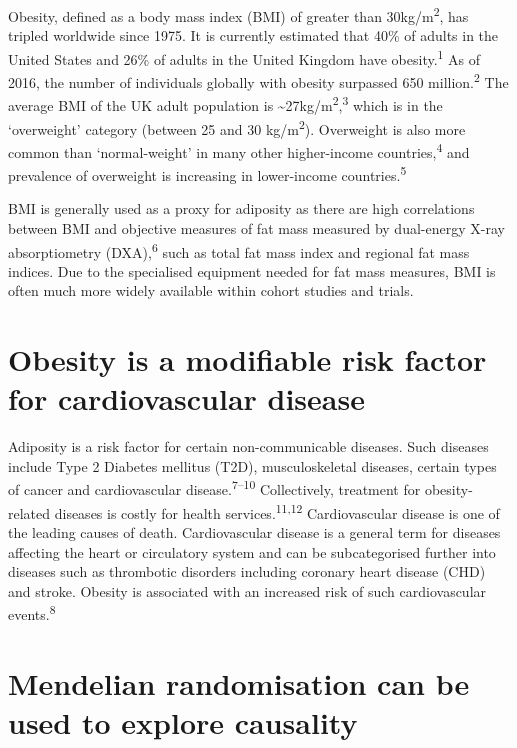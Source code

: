 \documentclass[11pt,twoside]{bristolthesis}
\begin{document}
Obesity, defined as a body mass index (BMI) of greater than 30kg/m\textsuperscript{2}, has tripled worldwide since 1975. It is currently estimated that 40\% of adults in the United States and 26\% of adults in the United Kingdom have obesity.\textsuperscript{1} As of 2016, the number of individuals globally with obesity surpassed 650 million.\textsuperscript{2} The average BMI of the UK adult population is \textasciitilde27kg/m\textsuperscript{2},\textsuperscript{3} which is in the `overweight' category (between 25 and 30 kg/m\textsuperscript{2}). Overweight is also more common than `normal-weight' in many other higher-income countries,\textsuperscript{4} and prevalence of overweight is increasing in lower-income countries.\textsuperscript{5}

BMI is generally used as a proxy for adiposity as there are high correlations between BMI and objective measures of fat mass measured by dual-energy X-ray absorptiometry (DXA),\textsuperscript{6} such as total fat mass index and regional fat mass indices. Due to the specialised equipment needed for fat mass measures, BMI is often much more widely available within cohort studies and trials.

\hypertarget{obesity-is-a-modifiable-risk-factor-for-cardiovascular-disease}{%
\section{Obesity is a modifiable risk factor for cardiovascular disease}\label{obesity-is-a-modifiable-risk-factor-for-cardiovascular-disease}}

Adiposity is a risk factor for certain non-communicable diseases. Such diseases include Type 2 Diabetes mellitus (T2D), musculoskeletal diseases, certain types of cancer and cardiovascular disease.\textsuperscript{7--10} Collectively, treatment for obesity-related diseases is costly for health services.\textsuperscript{11,12} Cardiovascular disease is one of the leading causes of death. Cardiovascular disease is a general term for diseases affecting the heart or circulatory system and can be subcategorised further into diseases such as thrombotic disorders including coronary heart disease (CHD) and stroke. Obesity is associated with an increased risk of such cardiovascular events.\textsuperscript{8}

\hypertarget{mendelian-randomisation-can-be-used-to-explore-causality}{%
\section{Mendelian randomisation can be used to explore causality}\label{mendelian-randomisation-can-be-used-to-explore-causality}}
\end{document}
